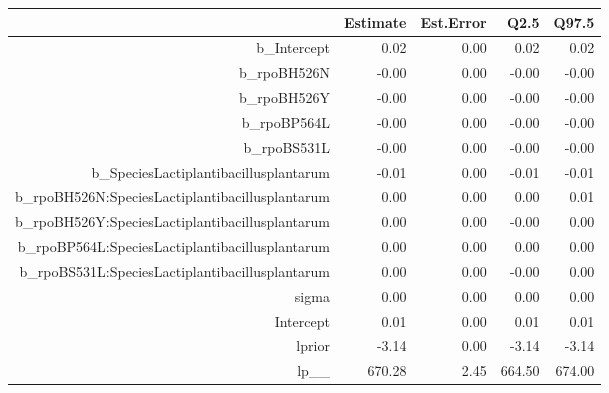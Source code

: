 \begin{table}[ht]
\centering
\begin{tabular}{rrrrr}
  \hline
 & Estimate & Est.Error & Q2.5 & Q97.5 \\ 
  \hline
b\_Intercept & 0.02 & 0.00 & 0.02 & 0.02 \\ 
  b\_rpoBH526N & -0.00 & 0.00 & -0.00 & -0.00 \\ 
  b\_rpoBH526Y & -0.00 & 0.00 & -0.00 & -0.00 \\ 
  b\_rpoBP564L & -0.00 & 0.00 & -0.00 & -0.00 \\ 
  b\_rpoBS531L & -0.00 & 0.00 & -0.00 & -0.00 \\ 
  b\_SpeciesLactiplantibacillusplantarum & -0.01 & 0.00 & -0.01 & -0.01 \\ 
  b\_rpoBH526N:SpeciesLactiplantibacillusplantarum & 0.00 & 0.00 & 0.00 & 0.01 \\ 
  b\_rpoBH526Y:SpeciesLactiplantibacillusplantarum & 0.00 & 0.00 & -0.00 & 0.00 \\ 
  b\_rpoBP564L:SpeciesLactiplantibacillusplantarum & 0.00 & 0.00 & 0.00 & 0.00 \\ 
  b\_rpoBS531L:SpeciesLactiplantibacillusplantarum & 0.00 & 0.00 & -0.00 & 0.00 \\ 
  sigma & 0.00 & 0.00 & 0.00 & 0.00 \\ 
  Intercept & 0.01 & 0.00 & 0.01 & 0.01 \\ 
  lprior & -3.14 & 0.00 & -3.14 & -3.14 \\ 
  lp\_\_ & 670.28 & 2.45 & 664.50 & 674.00 \\ 
   \hline
\end{tabular}
\end{table}

